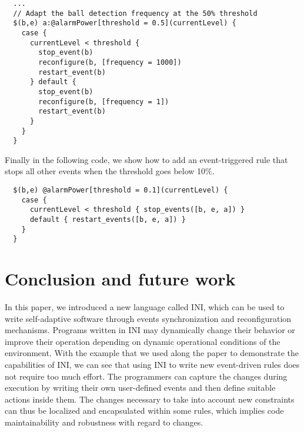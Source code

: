 \documentclass[runningheads,a4paper]{llncs}
\begin{document}
\begin{lstlisting}
  ...
  // Adapt the ball detection frequency at the 50% threshold
  $(b,e) a:@alarmPower[threshold = 0.5](currentLevel) {
    case {
      currentLevel < threshold {
        stop_event(b)
        reconfigure(b, [frequency = 1000])
        restart_event(b)
      } default {
        stop_event(b)
        reconfigure(b, [frequency = 1])
        restart_event(b)
      }
    }
  }
  \end{lstlisting}

Finally in the following code, we show how to add an event-triggered rule that stops all other events when the threshold goes below 10\%.

\begin{lstlisting}
  $(b,e) @alarmPower[threshold = 0.1](currentLevel) {
    case {
      currentLevel < threshold { stop_events([b, e, a]) }
      default { restart_events([b, e, a]) }
    }
  }
\end{lstlisting}

\section{Conclusion and future work}\label{sec:Conclusion}

In this paper, we introduced a new language called INI, which can be used to write self-adaptive software through events synchronization and reconfiguration mechanisms. Programs written in INI may dynamically change their behavior or improve their operation depending on dynamic operational conditions of the environment. With the example that we used along the paper to demonstrate the capabilities of INI, we can see that using INI to write new event-driven rules does not require too much effort. The programmers can capture the changes during execution by writing their own user-defined events and then define suitable actions inside them. The changes necessary to take into account new constraints can thus be localized and encapsulated within some rules, which implies code maintainability and robustness with regard to changes.
\end{document}
